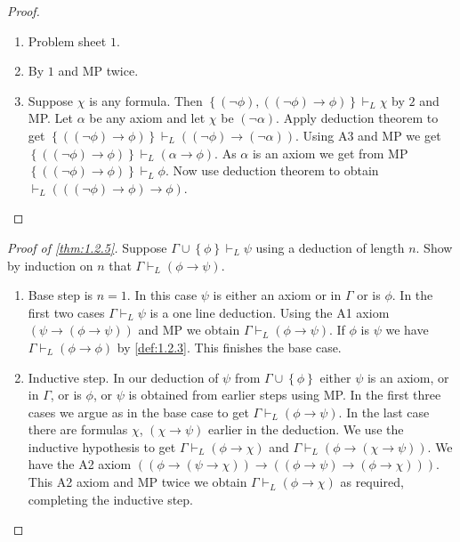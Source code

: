 \documentclass{article}
\newcommand{\rb}[1]{\left( #1 \right)}
\newcommand{\cb}[1]{\left\{ #1 \right\}}
\newcommand{\notb}[1]{\rb{\neg #1}}
\newcommand{\impb}[2]{\rb{#1 \rightarrow #2}}
\theoremstyle{definition}\newtheorem{definition}{Definition}[subsection]
\theoremstyle{definition}\newtheorem{remark}[definition]{Remark}
\theoremstyle{definition}\newtheorem*{example}{Example}
\theoremstyle{definition}\newtheorem*{note}{Note}
\begin{document}
\begin{proof}
\hfill
\begin{enumerate}
\item Problem sheet $ 1 $.
\item By $ 1 $ and MP twice.
\item Suppose $ \chi $ is any formula. Then $ \cb{\notb{\phi}, \impb{\notb{\phi}}{\phi}} \vdash_L \chi $ by $ 2 $ and MP. Let $ \alpha $ be any axiom and let $ \chi $ be $ \notb{\alpha} $. Apply deduction theorem to get $ \cb{\impb{\notb{\phi}}{\phi}} \vdash_L \impb{\notb{\phi}}{\notb{\alpha}} $. Using A3 and MP we get $ \cb{\impb{\notb{\phi}}{\phi}} \vdash_L \impb{\alpha}{\phi} $. As $ \alpha $ is an axiom we get from MP $ \cb{\impb{\notb{\phi}}{\phi}} \vdash_L \phi $. Now use deduction theorem to obtain $ \vdash_L \impb{\impb{\notb{\phi}}{\phi}}{\phi} $.
\end{enumerate}
\end{proof}

\begin{proof}[Proof of \ref{thm:1.2.5}]
Suppose $ \Gamma \cup \cb{\phi} \vdash_L \psi $ using a deduction of length $ n $. Show by induction on $ n $ that $ \Gamma \vdash_L \impb{\phi}{\psi} $.
\begin{enumerate}
\item Base step is $ n = 1 $. In this case $ \psi $ is either an axiom or in $ \Gamma $ or is $ \phi $. In the first two cases $ \Gamma \vdash_L \psi $ is a one line deduction. Using the A1 axiom $ \impb{\psi}{\impb{\phi}{\psi}} $ and MP we obtain $ \Gamma \vdash_L \impb{\phi}{\psi} $. If $ \phi $ is $ \psi $ we have $ \Gamma \vdash_L \impb{\phi}{\phi} $ by \ref{def:1.2.3}. This finishes the base case.
\item Inductive step. In our deduction of $ \psi $ from $ \Gamma \cup \cb{\phi} $ either $ \psi $ is an axiom, or in $ \Gamma $, or is $ \phi $, or $ \psi $ is obtained from earlier steps using MP. In the first three cases we argue as in the base case to get $ \Gamma \vdash_L \impb{\phi}{\psi} $. In the last case there are formulas $ \chi $, $ \impb{\chi}{\psi} $ earlier in the deduction. We use the inductive hypothesis to get $ \Gamma \vdash_L \impb{\phi}{\chi} $ and $ \Gamma \vdash_L \impb{\phi}{\impb{\chi}{\psi}} $. We have the A2 axiom $ \impb{\impb{\phi}{\impb{\psi}{\chi}}}{\impb{\impb{\phi}{\psi}}{\impb{\phi}{\chi}}} $. This A2 axiom and MP twice we obtain $ \Gamma \vdash_L \impb{\phi}{\chi} $ as required, completing the inductive step.
\end{enumerate}
\end{proof}
\end{document}
